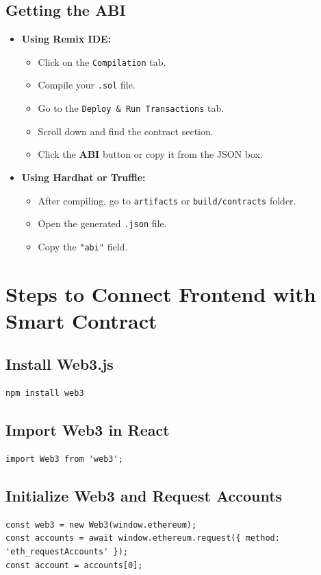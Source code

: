 \documentclass[12pt, a4paper]{article}
\begin{document}
\subsection*{Getting the ABI}
\begin{itemize}
  \item \textbf{Using Remix IDE:}
    \begin{itemize}
      \item Click on the \texttt{Compilation} tab.
      \item Compile your \texttt{.sol} file.
      \item Go to the \texttt{Deploy \& Run Transactions} tab.
      \item Scroll down and find the contract section.
      \item Click the \textbf{ABI} button or copy it from the JSON box.
    \end{itemize}
  \item \textbf{Using Hardhat or Truffle:}
    \begin{itemize}
      \item After compiling, go to \texttt{artifacts} or \texttt{build/contracts} folder.
      \item Open the generated \texttt{.json} file.
      \item Copy the \texttt{"abi"} field.
    \end{itemize}
\end{itemize}

\section{Steps to Connect Frontend with Smart Contract}

\subsection{Install Web3.js}
\begin{verbatim}
npm install web3
\end{verbatim}

\subsection{Import Web3 in React}
\begin{verbatim}
import Web3 from 'web3';
\end{verbatim}

\subsection{Initialize Web3 and Request Accounts}
\begin{verbatim}
const web3 = new Web3(window.ethereum);
const accounts = await window.ethereum.request({ method: 'eth_requestAccounts' });
const account = accounts[0];
\end{verbatim}
\end{document}
